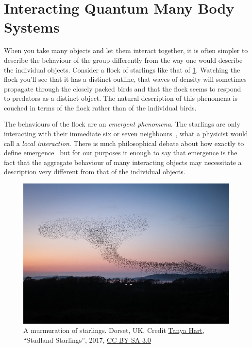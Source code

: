 \hypertarget{interacting-quantum-many-body-systems}{%
\section{Interacting Quantum Many Body Systems}\label{interacting-quantum-many-body-systems}}

When you take many objects and let them interact together, it is often simpler to describe the behaviour of the group differently from the way one would describe the individual objects. Consider a flock of starlings like that of \cref{fig:Studland_Starlings}. Watching the flock you'll see that it has a distinct outline, that waves of density will sometimes propagate through the closely packed birds and that the flock seems to respond to predators as a distinct object. The natural description of this phenomena is couched in terms of the flock rather than of the individual birds.

The behaviours of the flock are an \emph{emergent phenomena}. The starlings are only interacting with their immediate six or seven neighbours~\autocite{king2012murmurations,balleriniInteractionRulingAnimal2008}, what a physicist would call a \emph{local interaction}. There is much philosophical debate about how exactly to define emergence~\autocite{andersonMoreDifferent1972,kivelsonDefiningEmergencePhysics2016} but for our purposes it enough to say that emergence is the fact that the aggregate behaviour of many interacting objects may necessitate a description very different from that of the individual objects.

\hypertarget{fig:Studland_Starlings}{%
\begin{figure}
\centering
\includegraphics[width=1\textwidth,height=\textheight]{figure_code/intro_chapter/Studland_Starlings.jpeg}
\caption[{A murmuration of Starlings}]{A murmuration of starlings. Dorset, UK. Credit \href{https://twitter.com/arripay}{Tanya Hart}, ``Studland Starlings'', 2017, \href{https://creativecommons.org/licenses/by-sa/3.0/deed.en}{CC BY-SA 3.0}}
\label{fig:Studland_Starlings}
\end{figure}
}

